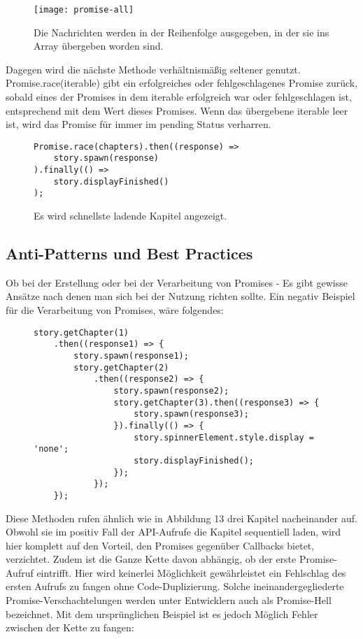 \begin{figure}[H]
\centering
\texttt{[image: promise-all]}
\caption{Die Nachrichten werden in der Reihenfolge ausgegeben, in der sie ins Array übergeben worden sind.}
\end{figure}

\noindent
Dagegen wird die nächste Methode verhältnismäßig seltener genutzt. Promise.race(iterable) gibt ein erfolgreiches oder fehlgeschlagenes Promise zurück, sobald eines der Promises in dem iterable erfolgreich war oder fehlgeschlagen ist, entsprechend mit dem Wert dieses Promises. Wenn das übergebene iterable leer ist, wird das Promise für immer im pending Status verharren.\cite{promise-race}

\begin{figure}[H]
\begin{lstlisting}[basicstyle=\small]
Promise.race(chapters).then((response) =>
    story.spawn(response)
).finally(() =>
    story.displayFinished()
);
\end{lstlisting}
\caption{Es wird schnellste ladende Kapitel angezeigt.}
\end{figure}

\subsection{Anti-Patterns und Best Practices}

Ob bei der Erstellung oder bei der Verarbeitung von Promises - Es gibt gewisse Ansätze nach denen man sich bei der Nutzung richten sollte. Ein negativ Beispiel für die Verarbeitung von Promises, wäre folgendes:

\begin{figure}[H]
\begin{lstlisting}[basicstyle=\small]
story.getChapter(1)
    .then((response1) => {
        story.spawn(response1);
        story.getChapter(2)
            .then((response2) => {
                story.spawn(response2);
                story.getChapter(3).then((response3) => {
                    story.spawn(response3);
                }).finally(() => {
                    story.spinnerElement.style.display = 'none';
                    story.displayFinished();
                });
            });
    });
\end{lstlisting}
\end{figure}

\noindent
Diese Methoden rufen ähnlich wie in Abbildung 13 drei Kapitel nacheinander auf. Obwohl sie im positiv Fall der API-Aufrufe die Kapitel sequentiell laden, wird hier komplett auf den Vorteil, den Promises gegenüber Callbacks bietet, verzichtet. Zudem ist die Ganze Kette davon abhängig, ob der erste Promise-Aufruf eintrifft. Hier wird keinerlei Möglichkeit gewährleistet ein Fehlschlag des ersten Aufrufs zu fangen ohne Code-Duplizierung. Solche ineinandergegliederte Promise-Verschachtelungen werden unter Entwicklern auch als \glqq{}Promise-Hell\grqq{} bezeichnet.
Mit dem ursprünglichen Beispiel ist es jedoch Möglich Fehler zwischen der Kette zu fangen:

